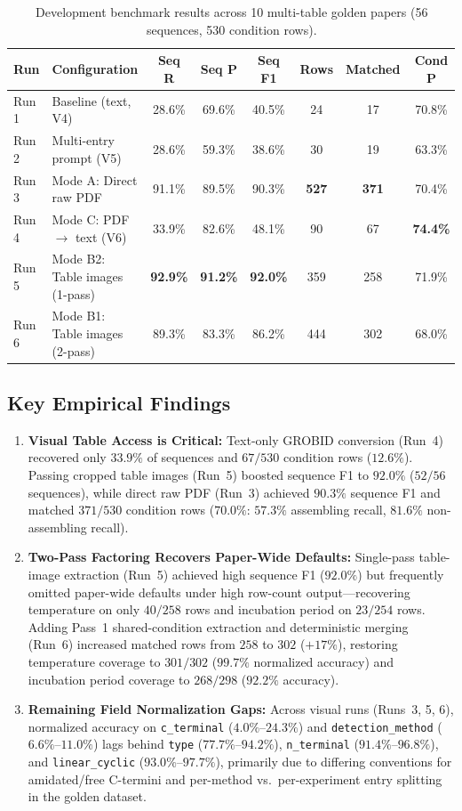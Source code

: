 \begin{table}[htbp]
\centering
\caption{Development benchmark results across 10 multi-table golden papers (56 sequences, 530 condition rows).}
\label{tab:dev_benchmark}
\small
\begin{tabular}{@{}llcccccc@{}}
\toprule
\textbf{Run} & \textbf{Configuration} & \textbf{Seq R} & \textbf{Seq P} & \textbf{Seq F1} & \textbf{Rows} & \textbf{Matched} & \textbf{Cond P} \\
\midrule
Run 1 & Baseline (text, V4) & 28.6\% & 69.6\% & 40.5\% & 24 & 17 & 70.8\% \\
Run 2 & Multi-entry prompt (V5) & 28.6\% & 59.3\% & 38.6\% & 30 & 19 & 63.3\% \\
Run 3 & Mode A: Direct raw PDF & 91.1\% & 89.5\% & 90.3\% & \textbf{527} & \textbf{371} & 70.4\% \\
Run 4 & Mode C: PDF $\rightarrow$ text (V6) & 33.9\% & 82.6\% & 48.1\% & 90 & 67 & \textbf{74.4\%} \\
Run 5 & Mode B2: Table images (1-pass) & \textbf{92.9\%} & \textbf{91.2\%} & \textbf{92.0\%} & 359 & 258 & 71.9\% \\
Run 6 & Mode B1: Table images (2-pass) & 89.3\% & 83.3\% & 86.2\% & 444 & 302 & 68.0\% \\
\bottomrule
\end{tabular}
\end{table}

\subsection{Key Empirical Findings}
\begin{enumerate}
    \item \textbf{Visual Table Access is Critical:} Text-only GROBID conversion (Run~4) recovered only $33.9\%$ of sequences and $67/530$ condition rows ($12.6\%$). Passing cropped table images (Run~5) boosted sequence F1 to $92.0\%$ ($52/56$ sequences), while direct raw PDF (Run~3) achieved $90.3\%$ sequence F1 and matched $371/530$ condition rows ($70.0\%$: $57.3\%$ assembling recall, $81.6\%$ non-assembling recall).
    \item \textbf{Two-Pass Factoring Recovers Paper-Wide Defaults:} Single-pass table-image extraction (Run~5) achieved high sequence F1 ($92.0\%$) but frequently omitted paper-wide defaults under high row-count output---recovering temperature on only $40/258$ rows and incubation period on $23/254$ rows. Adding Pass~1 shared-condition extraction and deterministic merging (Run~6) increased matched rows from $258$ to $302$ ($+17\%$), restoring temperature coverage to $301/302$ ($99.7\%$ normalized accuracy) and incubation period coverage to $268/298$ ($92.2\%$ accuracy).
    \item \textbf{Remaining Field Normalization Gaps:} Across visual runs (Runs~3, 5, 6), normalized accuracy on \texttt{c\_terminal} ($4.0\%$--$24.3\%$) and \texttt{detection\_method} ($6.6\%$--$11.0\%$) lags behind \texttt{type} ($77.7\%$--$94.2\%$), \texttt{n\_terminal} ($91.4\%$--$96.8\%$), and \texttt{linear\_cyclic} ($93.0\%$--$97.7\%$), primarily due to differing conventions for amidated/free C-termini and per-method vs.\ per-experiment entry splitting in the golden dataset.
\end{enumerate}
